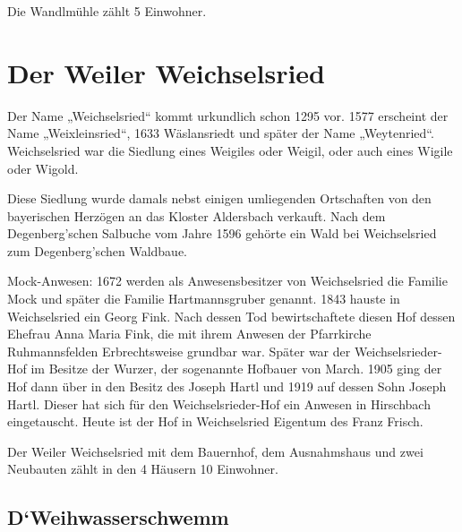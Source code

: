 \documentclass[12pt,a4pager]{book}
\begin{document}
Die Wandlmühle zählt 5 Einwohner.

\section{Der Weiler Weichselsried}

Der Name „Weichselsried“ kommt urkundlich schon 1295 vor. 1577 erscheint der
Name „Weixleinsried“, 1633 Wäslansriedt und später der Name „Weytenried“.
Weichselsried war die Siedlung eines Weigiles oder Weigil, oder auch eines
Wigile oder Wigold.

Diese Siedlung wurde damals nebst einigen umliegenden Ortschaften von den
bayerischen Herzögen an das Kloster Aldersbach verkauft. Nach dem
Degenberg'schen Salbuche vom Jahre 1596 gehörte ein Wald bei Weichselsried zum
Degenberg'schen Waldbaue.

Mock-Anwesen: 1672 werden als Anwesensbesitzer von Weichselsried die Familie
Mock und später die Familie Hartmannsgruber genannt. 1843 hauste in
Weichselsried ein Georg Fink. Nach dessen Tod bewirtschaftete diesen Hof dessen
Ehefrau Anna Maria Fink, die mit ihrem Anwesen der Pfarrkirche Ruhmannsfelden
Erbrechtsweise grundbar war. Später war der Weichselsrieder-Hof im Besitze der
Wurzer, der sogenannte Hofbauer von March. 1905 ging der Hof dann über in den
Besitz des Joseph Hartl und 1919 auf dessen Sohn Joseph Hartl. Dieser hat sich
für den Weichselsrieder-Hof ein Anwesen in Hirschbach eingetauscht. Heute ist
der Hof in Weichselsried Eigentum des Franz Frisch.

Der Weiler Weichselsried mit dem Bauernhof, dem Ausnahmshaus und zwei Neubauten
zählt in den 4 Häusern 10 Einwohner.

\subsection{D`Weihwasserschwemm}
\end{document}
